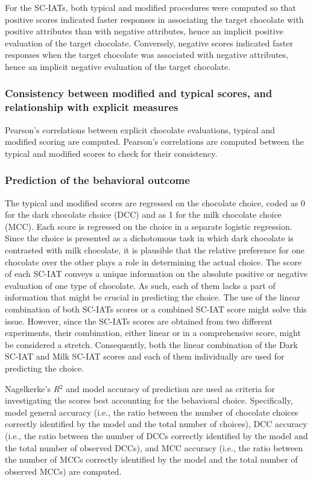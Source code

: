\documentclass[12pt]{book}
\begin{document}
For the SC-IATs, both typical and modified procedures were computed so that positive scores indicated faster responses in associating the target chocolate with positive attributes than with negative attributes, hence an implicit positive evaluation of the target chocolate. Conversely, negative scores indicated faster responses when the target chocolate was associated with negative attributes, hence an implicit negative evaluation of the target chocolate.

\subsubsection{Consistency between modified and typical scores, and relationship with explicit measures}

Pearson's correlations between explicit chocolate evaluations, typical and modified scoring are computed. 
Pearson's correlations are computed between the typical and modified scores to check for their consistency. 


\subsubsection{Prediction of the behavioral outcome}\label{subsub:predchoice}

The typical and modified scores are regressed on the  chocolate choice, coded as 0 for the dark chocolate choice (DCC) and as 1 for the milk chocolate choice (MCC).
Each score is regressed on the choice in a separate logistic regression. 
Since the choice is presented as a dichotomous task in which dark chocolate is contrasted with milk chocolate, it is plausible that the relative preference for one chocolate over the other plays a role in determining the actual choice. 
The score of each SC-IAT conveys a unique information on the absolute positive or negative evaluation of one type of chocolate. As such, each of them lacks a part of information that might be crucial in predicting the choice. 
The use of the linear combination of both SC-IATs scores or a combined SC-IAT score might solve this issue. However, since the SC-IATs scores are obtained from two different experiments, their combination, either linear or in a comprehensive score, might be considered a stretch.
Consequently, both the linear combination of the Dark SC-IAT and Milk SC-IAT scores and each of them individually are used for predicting the choice.

Nagelkerke’s \emph{R}$^2$ \cite{nagel} and model accuracy of prediction \cite{faraway2006} are used as criteria for investigating the scores best accounting for the behavioral choice. 
Specifically, model general accuracy (i.e., the ratio between the number of chocolate choices correctly identified by the model and the total number of choices), DCC accuracy (i.e., the ratio between the number of DCCs correctly identified by the model and the total number of observed DCCs), and MCC accuracy (i.e., the ratio between the number of MCCs correctly identified by the model and the total number of observed MCCs) are computed.
\end{document}
